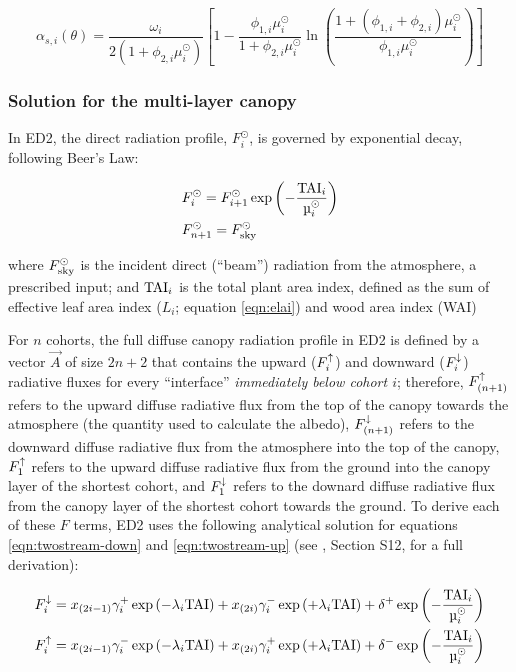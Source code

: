 \begin{equation}
  \alpha_{s,i}(\theta) = \frac{\omega_{i}}{2\left( 1 + \phi_{2,i} \mu^{\odot}_{i} \right)}
  \left[ 1 - \frac{\phi_{1,i}\mu^{\odot}_{i}}{1 + \phi_{2,i}\mu^{\odot}_{i}} \ln\left( \frac{1 + (\phi_{1,i} + \phi_{2,i})\mu^{\odot}_{i}} {\phi_{1,i}\mu^{\odot}_{i}} \right)  \right]
\end{equation}

\subsubsection{Solution for the multi-layer canopy}

In ED2, the direct radiation profile, $F^{\odot}_{i}$, is governed by exponential decay, following Beer's Law:

\begin{align}
  & F^{\odot}_{i} = F^{\odot}_{i+1} \exp\left( -\frac{\TAI_{i}}{\mu^{\odot}_{i}} \right) \\
  & F^{\odot}_{n+1} = F^{\odot}_{\sky}
\end{align}

where $F^{\odot}_{\mathrm{sky}}$ is the incident direct (``beam'') radiation from the atmosphere, a prescribed input;
and $\mathrm{TAI}_{i}$ is the total plant area index, defined as the sum of effective leaf area index ($L_{i}$; equation \ref{eqn:elai}) and wood area index (WAI)

For $n$ cohorts, the full diffuse canopy radiation profile in ED2 is defined by a vector $\vec{A}$ of size $2n + 2$ that contains the upward ($F^{\uparrow}_{i}$) and downward ($F^{\downarrow}_{i}$) radiative fluxes for every ``interface'' \emph{immediately below cohort $i$}; therefore,
$F^{\uparrow}_{(n+1)}$ refers to the upward diffuse radiative flux from the top of the canopy towards the atmosphere (the quantity used to calculate the albedo),
$F^{\downarrow}_{(n+1)}$ refers to the downward diffuse radiative flux from the atmosphere into the top of the canopy,
$F^{\uparrow}_{1}$ refers to the upward diffuse radiative flux from the ground into the canopy layer of the shortest cohort,
and
$F^{\downarrow}_{1}$ refers to the downard diffuse radiative flux from the canopy layer of the shortest cohort towards the ground.
To derive each of these $F$ terms, ED2 uses the following analytical solution for equations \ref{eqn:twostream-down} and \ref{eqn:twostream-up} (see \citealt{longo2019ed2description}, Section S12, for a full derivation):

\begin{align}
  & F^{\down}_{i}
    = x_{(2i-1)}\gamma^{+}_{i}  \exp\left( -\lambda_{i} \TAI \right)
    + x_{(2i)}\gamma^{-}_{i}    \exp\left( +\lambda_{i} \TAI \right)
    + \delta^{+}               \exp\left( -\frac{\TAI_{i}}{\mu^{\odot}_{i}} \right) \label{eqn:edr-fdown} \\
  & F^{\up}_{i}
    = x_{(2i-1)}\gamma^{-}_{i}  \exp\left( -\lambda_{i} \TAI \right)
    + x_{(2i)}\gamma^{+}_{i}    \exp\left( +\lambda_{i} \TAI \right)
    + \delta^{-}               \exp\left( -\frac{\TAI_{i}}{\mu^{\odot}_{i}} \right) \label{eqn:edr-fup}
\end{align}

